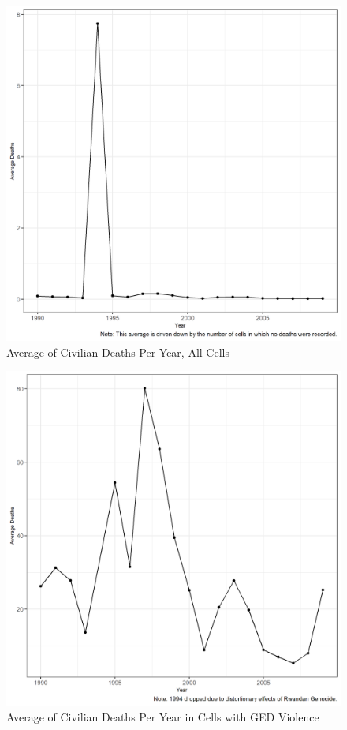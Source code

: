 \begin{figure}
	\includegraphics[scale=.7]{fig3}
	\caption{Average of Civilian Deaths Per Year, All Cells}
\end{figure} 
\begin{figure}
	\includegraphics[scale=.7]{fig4}
	\caption{Average of Civilian Deaths Per Year in Cells with GED Violence}
\end{figure} 
